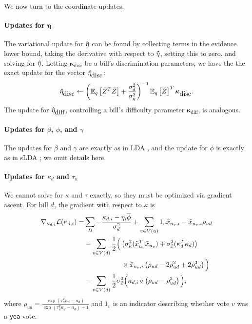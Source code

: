 We now turn to the coordinate updates.

\paragraph{Updates for $\bm \eta$}
The variational update for $\bm \hat \eta$ can be found by collecting terms in
the evidence lower bound, taking the derivative with respect to $\bm \hat \eta$,
setting this to zero, and solving for $\bm \hat \eta$.  Letting $\bm
\kappa_{\mbox{disc}}$ be a bill's discrimination parameters, we
have the the exact update for the vector $\bm \hat \eta_{\mbox{disc}}$:
\begin{align*}
\bm \hat \eta_{\mbox{disc}} \gets 
 \left(\mathbb{E}_q\left[\bar{Z}^T\bar{Z}\right] + \frac{\sigma_d^2}{\sigma_\eta^2 } \right)^{-1}
   \mathbb{E}_q\left[\bar{Z}\right]^T \bm \kappa_{\mbox{disc}}. \nonumber
\end{align*}
The update for $\bm \hat \eta_{\mbox{diff}}$, controlling a bill's difficulty parameter $\bm \kappa_{\mbox{diff}}$, is analogous.

\paragraph{Updates for $\beta$, $\phi$, and $\gamma$}
The updates for $\beta$ and $\gamma$ are exactly as in LDA
\cite{blei:2003}, and the update for $\phi$ is exactly as in sLDA
\cite{blei:2008}; we omit details here.

\paragraph{Updates for $\kappa_d$ and $\tau_u$}
We cannot solve for $\kappa$ and $\tau$ exactly, so they must be
optimized via gradient ascent.  For bill $d$, the gradient with
respect to $\kappa$ is
\begin{align}
\label{eq:kappa_update}
\hspace{-0pt}  \nabla_{\kappa_{d,i}} \mathcal{L}(\kappa_{d, i}) =
& \sum_{D} - \frac{\kappa_{d, i} - \eta_i \overline{\phi}}{\sigma^2_d} 
 +  \sum_{v \in V(u)} 1_v {\tilde x}_{u_v, i} - {\tilde x}_{u_v, i} \rho_{ud} \nonumber \\
 & - \sum_{v \in V(d)} \frac{1}{2}
     \Big( \left( \sigma_\kappa^2 ({\tilde x}_{u_v}^T {\tilde x}_{u_v}) + \sigma_{\tilde x}^2 (\kappa_d^T \kappa_d) \right) \nonumber \\
 & \hspace{55pt} \times {\tilde x}_{u_v, i} \left( \rho_{ud} - 2 \rho_{ud}^2 + 2 \rho_{ud}^3 \right) \Big) \nonumber \\
  &  - \sum_{v \in V(d)} \frac{1}{2} \sigma_{\tilde x}^2 \Big( \kappa_{d,i} \circ
     \left( \rho_{ud}
     - \rho_{ud}^2 \right) \Big), \nonumber
\end{align}
where $\rho_{ud} = \frac{\exp(\tau_u^T \kappa_d - a_d)}{\exp(\tau_u^T
  \kappa_d - a_d) + 1}$ and $1_v$ is an indicator describing whether
vote $v$ was a \verb!yea!-vote.

